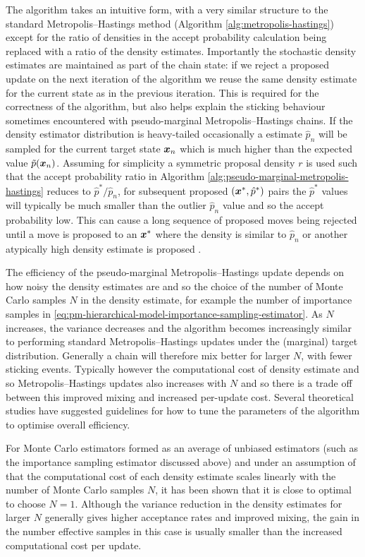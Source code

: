 The algorithm takes an intuitive form, with a very similar structure to the standard Metropolis--Hastings method (Algorithm \ref{alg:metropolis-hastings}) except for the ratio of densities in the accept probability calculation being replaced with a ratio of the density estimates. Importantly the stochastic density estimates are maintained as part of the chain state: if we reject a proposed update on the next iteration of the algorithm we reuse the same density estimate for the current state as in the previous iteration. This is required for the correctness of the algorithm, but also helps explain the sticking behaviour sometimes encountered with pseudo-marginal Metropolis--Hastings chains. If the density estimator distribution is heavy-tailed occasionally a estimate $\hat{p}_n$ will be sampled for the current target state $\boldsymbol{x}_n$ which is much higher than the expected value $\tilde{p}(\boldsymbol{x}_n)$. Assuming for simplicity a symmetric proposal density $r$ is used such that the accept probability ratio in Algorithm \ref{alg:pseudo-marginal-metropolis-hastings} reduces to $\hat{p}^* / \hat{p}_n$, for subsequent proposed $(\boldsymbol{x}^*,\hat{p}^*)$ pairs the $\hat{p}^*$ values will typically be much smaller than the outlier $\hat{p}_n$ value and so the accept probability low. This can cause a long sequence of proposed moves being rejected until a move is proposed to an $\boldsymbol{x}^*$ where the density is similar to $\hat{p}_n$ or another atypically high density estimate is proposed \citep{filippone2014pseudo,andrieu2009pseudo,sherlock2015efficiency}.

The efficiency of the pseudo-marginal Metropolis--Hastings update depends on how noisy the density estimates are and so the choice of the number of Monte Carlo samples $N$ in the density estimate, for example the number of importance samples in \eqref{eq:pm-hierarchical-model-importance-sampling-estimator}. As $N$ increases, the variance decreases and the algorithm becomes increasingly similar to performing standard Metropolis--Hastings updates under the (marginal) target distribution. Generally a chain will therefore mix better for larger $N$, with fewer sticking events. Typically however the computational cost of density estimate and so Metropolis--Hastings updates also increases with $N$ and so there is a trade off between this improved mixing and increased per-update cost. Several theoretical studies have suggested guidelines for how to tune the parameters of the algorithm to optimise overall efficiency.

For Monte Carlo estimators formed as an average of unbiased estimators (such as the importance sampling estimator discussed above) and under an assumption of that the computational cost of each density estimate scales linearly with the number of Monte Carlo samples $N$, it has been shown \citep{sherlock2016pseudo,bornn2017use} that it is close to optimal to choose $N = 1$. Although the variance reduction in the density estimates for larger $N$ generally gives higher acceptance rates and improved mixing, the gain in the number effective samples in this case is usually smaller than the increased computational cost per update.

